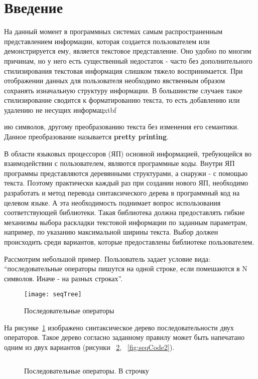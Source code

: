 \section*{Введение}

На данный момент в программных системах самым распространенным представлением информации, которая создается пользователем или демонстрируется ему, является текстовое представление. Оно удобно по многим причинам, но у него есть существенный недостаток - часто без дополнительного стилизирования текстовая информация слишком тяжело воспринимается. При отображении данных для пользователя необходимо явственным образом сохранять изначальную структуру информации. В большинстве случаев такое стилизирование сводится к форматированию текста, то есть добавлению или удалению не несущих информацxtbf{ию символов, другому преобразованию текста без изменения его семантики. Данное преобразование называется \textbf{pretty printing}.

В области языковых процессоров (ЯП) основной информацией, требующейся во взаимодействии с пользователем, являются программные коды. Внутри ЯП программы представляются деревянными структурами, а снаружи - с помощью текста. Поэтому практически каждый раз при создании нового ЯП, необходимо разработать и метод перевода синтаксического дерева в программный код на целевом языке. А эта необходимость поднимает вопрос использования соответствующей библиотеки. Такая библиотека должна предоставлять гибкие механизмы выбора раскладки текстовой информации по заданным параметрам, например, по указанию максимальной ширины текста. Выбор должен происходить среди вариантов, которые предоставлены библиотеке пользователем.

Рассмотрим небольшой пример. Пользователь задает условие вида: “последовательные операторы пишутся на одной строке, если помешаются в N символов. Иначе - на разных строках”.


\begin{figure}[h]
	\centering
	\texttt{[image: seqTree]}
	\caption{Последовательные операторы}
	\label{fig:seqImage}
\end{figure}

На рисунке~\ref{fig:seqImage} изображено синтаксическое дерево последовательности двух операторов. Такое дерево согласно заданному правилу может быть напечатано одним из двух вариантов (рисунки ~\ref{fig:seqCode1}, ~\ref{fig:seqCode2}).

\begin{figure}[h]
	\inputminted{c}{codes/seqCode1.java}
	\caption{Последовательные операторы. В строчку}
	\label{fig:seqCode1}
\end{figure}

}
